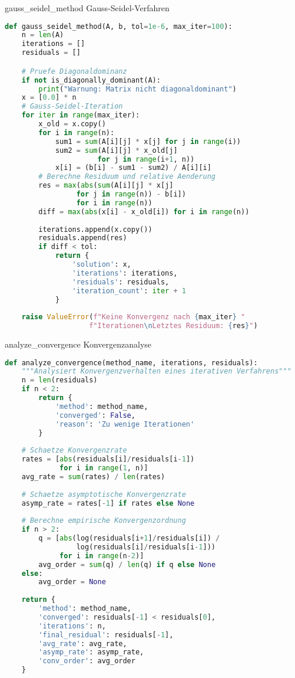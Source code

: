 \begin{examplecode}[breakable]{gauss\_seidel\_method} Gauss-Seidel-Verfahren
\begin{lstlisting}[language=Python, style=basesmol]
def gauss_seidel_method(A, b, tol=1e-6, max_iter=100):
    n = len(A)
    iterations = []
    residuals = []

    # Pruefe Diagonaldominanz
    if not is_diagonally_dominant(A):
        print("Warnung: Matrix nicht diagonaldominant")
    x = [0.0] * n
    # Gauss-Seidel-Iteration
    for iter in range(max_iter):
        x_old = x.copy()
        for i in range(n):
            sum1 = sum(A[i][j] * x[j] for j in range(i))
            sum2 = sum(A[i][j] * x_old[j] 
                      for j in range(i+1, n))
            x[i] = (b[i] - sum1 - sum2) / A[i][i]
        # Berechne Residuum und relative Aenderung
        res = max(abs(sum(A[i][j] * x[j] 
                 for j in range(n)) - b[i]) 
                 for i in range(n))
        diff = max(abs(x[i] - x_old[i]) for i in range(n))
        
        iterations.append(x.copy())
        residuals.append(res)
        if diff < tol:
            return {
                'solution': x,
                'iterations': iterations,
                'residuals': residuals,
                'iteration_count': iter + 1
            }
            
    raise ValueError(f"Keine Konvergenz nach {max_iter} "
                    f"Iterationen\nLetztes Residuum: {res}")
\end{lstlisting}
\end{examplecode}

\begin{examplecode}{analyze\_convergence} Konvergenzanalyse
\begin{lstlisting}[language=Python, style=basesmol]
def analyze_convergence(method_name, iterations, residuals):
    """Analysiert Konvergenzverhalten eines iterativen Verfahrens"""
    n = len(residuals)
    if n < 2:
        return {
            'method': method_name,
            'converged': False,
            'reason': 'Zu wenige Iterationen'
        }
        
    # Schaetze Konvergenzrate
    rates = [abs(residuals[i]/residuals[i-1]) 
             for i in range(1, n)]
    avg_rate = sum(rates) / len(rates)
    
    # Schaetze asymptotische Konvergenzrate
    asymp_rate = rates[-1] if rates else None
    
    # Berechne empirische Konvergenzordnung
    if n > 2:
        q = [abs(log(residuals[i+1]/residuals[i]) / 
                 log(residuals[i]/residuals[i-1])) 
             for i in range(n-2)]
        avg_order = sum(q) / len(q) if q else None
    else:
        avg_order = None
        
    return {
        'method': method_name,
        'converged': residuals[-1] < residuals[0],
        'iterations': n,
        'final_residual': residuals[-1],
        'avg_rate': avg_rate,
        'asymp_rate': asymp_rate,
        'conv_order': avg_order
    }
\end{lstlisting}
\end{examplecode}


